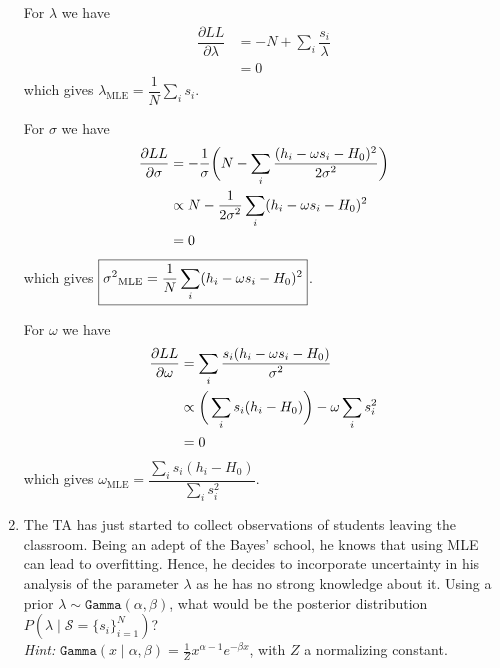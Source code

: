 \documentclass[11pt, a4paper]{article}
\begin{document}
\begin{enumerate}
\begin{solution}
        For $\lambda$ we have
        \begin{align*}
            \dfrac{\partial LL}{\partial \lambda} &= -N + \sum_i \dfrac{s_i}{\lambda}\\
            &= 0
        \end{align*}
        which gives $\boxed{\lambda_{\text{MLE}} = \dfrac{1}{N}\sum_i s_i}$. 

        For $\sigma$ we have
        \begin{align*}
            \dfrac{\partial LL}{\partial \sigma} &= -\dfrac{1}{\sigma}\bigg(N -\sum_i \dfrac{(h_i - \omega s_i - H_0)^2}{2\text{$\sigma^2$}}\bigg)\\
            &\propto N -\dfrac{1}{2\text{$\sigma^2$}}\sum_i (h_i - \omega s_i - H_0)^2\\
            &= 0
        \end{align*}
        which gives $\boxed{\text{$\sigma^2$}_{\text{MLE}} = \dfrac{1}{N}\sum_i (h_i - \omega s_i - H_0)^2}$.

        For $\omega$ we have
        \begin{align*}
            \dfrac{\partial LL}{\partial \omega} &= \sum_i \dfrac{s_i(h_i - \omega s_i - H_0)}{\text{$\sigma^2$}}\\
            &\propto \bigg(\sum_i s_i(h_i - H_0)\bigg) - \omega\sum_i s_i^2\\
            &= 0
        \end{align*}
        which gives $\boxed{\omega_{\text{MLE}} = \dfrac{\sum_i s_i(h_i - H_0)}{\sum_i s_i^2}}$.
        
    \end{solution} 
    \item The TA has just started to collect observations of students leaving the classroom. Being an adept of the Bayes' school, he knows that using MLE can lead to overfitting. Hence, he decides to incorporate uncertainty in his analysis of the parameter $\lambda$ as he has no strong knowledge about it. Using a prior $\lambda \sim \texttt{Gamma}(\alpha, \beta)$, what would be the posterior distribution $P(\lambda \mid \mathcal{S} = \{s_i\}_{i=1}^N)$?\\
    
    \textit{Hint:} $\texttt{Gamma}(x \mid \alpha, \beta) = \frac{1}{Z}x^{\alpha - 1} e^{-\beta x}$, with $Z$ a normalizing constant.
    

\end{enumerate}
\end{document}

